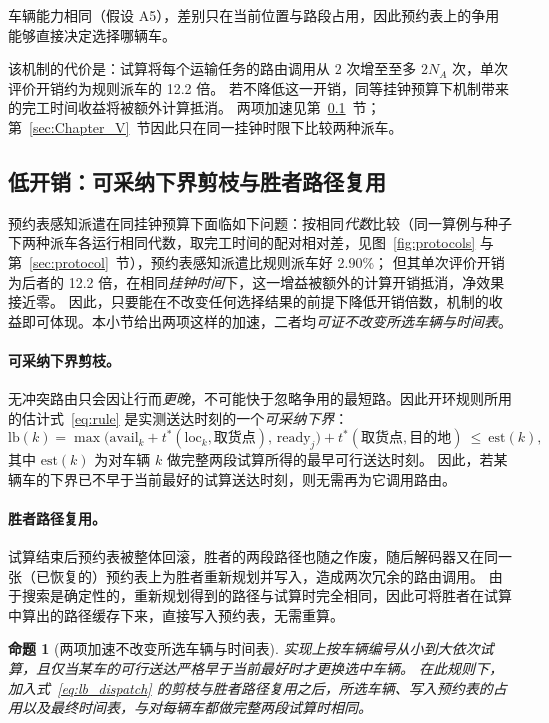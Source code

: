 \documentclass[manuscript,screen,review]{acmart}
\newtheorem{prop}{命题}
\newcommand{\CostMultBefore}{12.2}
\newcommand{\GainProbeSameGen}{2.90\%}
\begin{document}
车辆能力相同（假设 A5），差别只在当前位置与路段占用，因此预约表上的争用能够直接决定选择哪辆车。

该机制的代价是：试算将每个运输任务的路由调用从 $2$ 次增至至多 $2N_A$ 次，单次评价开销约为规则派车的 \CostMultBefore{} 倍。
若不降低这一开销，同等挂钟预算下机制带来的完工时间收益将被额外计算抵消。
两项加速见第~\ref{sec:speedup}~节；第~\ref{sec:Chapter_V}~节因此只在同一挂钟时限下比较两种派车。

\subsection{低开销：可采纳下界剪枝与胜者路径复用}
\label{sec:speedup}

预约表感知派遣在同挂钟预算下面临如下问题：按相同\emph{代数}比较（同一算例与种子下两种派车各运行相同代数，取完工时间的配对相对差，见图~\ref{fig:protocols} 与第~\ref{sec:protocol}~节），预约表感知派遣比规则派车好 \GainProbeSameGen{}；
但其单次评价开销为后者的 \CostMultBefore{} 倍，在相同\emph{挂钟时间}下，这一增益被额外的计算开销抵消，净效果接近零。
因此，只要能在不改变任何选择结果的前提下降低开销倍数，机制的收益即可体现。本小节给出两项这样的加速，二者均\emph{可证不改变所选车辆与时间表}。

\paragraph{可采纳下界剪枝。}
无冲突路由只会因让行而\emph{更晚}，不可能快于忽略争用的最短路。因此开环规则所用的估计式~\eqref{eq:rule} 是实测送达时刻的一个\emph{可采纳下界}：
\begin{equation}
\label{eq:lb_dispatch}
\mathrm{lb}(k)=\max\bigl(\mathrm{avail}_k+t^{*}(\mathrm{loc}_k,\text{取货点}),\,
\mathrm{ready}_j\bigr)+t^{*}(\text{取货点},\text{目的地})\ \le\ \mathrm{est}(k),
\end{equation}
其中 $\mathrm{est}(k)$ 为对车辆 $k$ 做完整两段试算所得的最早可行送达时刻。
因此，若某辆车的下界已不早于当前最好的试算送达时刻，则无需再为它调用路由。

\paragraph{胜者路径复用。}
试算结束后预约表被整体回滚，胜者的两段路径也随之作废，随后解码器又在同一张（已恢复的）预约表上为胜者重新规划并写入，造成两次冗余的路由调用。
由于搜索是确定性的，重新规划得到的路径与试算时完全相同，因此可将胜者在试算中算出的路径缓存下来，直接写入预约表，无需重算。

\begin{prop}[两项加速不改变所选车辆与时间表]
  \label{prop:speedup_equiv}
  实现上按车辆编号从小到大依次试算，且仅当某车的可行送达严格早于当前最好时才更换选中车辆。
  在此规则下，加入式~\eqref{eq:lb_dispatch} 的剪枝与胜者路径复用之后，所选车辆、写入预约表的占用以及最终时间表，与对每辆车都做完整两段试算时相同。
\end{prop}
\end{document}
